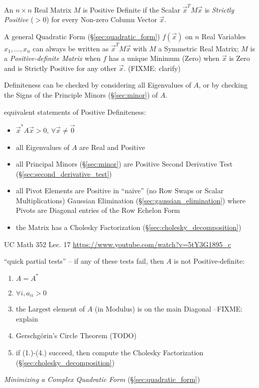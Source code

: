 An $n \times n$ Real Matrix $M$ is Positive Definite if the Scalar
$\vec{x}^TM\vec{x}$ is \emph{Strictly Positive} ($>0$) for every Non-zero
Column Vector $\vec{x}$.

A general Quadratic Form (\S\ref{sec:quadratic_form}) $f(\vec{x})$ on $n$ Real
Variables $x_1,\ldots,x_n$ can always be written as $\vec{x}^T M \vec{x}$ with
$M$ a Symmetric Real Matrix; $M$ is a \emph{Positive-definite Matrix} when $f$
has a unique Minimum (Zero) when $\vec{x}$ is Zero and is Strictly Positive for
any other $\vec{x}$. (FIXME: clarify)

Definiteness can be checked by considering all Eigenvalues of $A$, or by
checking the Signs of the Principle Minors (\S\ref{sec:minor}) of $A$.

equivalent statements of Positive Definiteness:
\begin{itemize}
  \item $\vec{x}^*A\vec{x} > 0$, $\forall \vec{x} \neq \vec{0}$
  \item all Eigenvalues of $A$ are Real and Positive
  \item all Principal Minors (\S\ref{sec:minor}) are Positive \fist Second
    Derivative Test (\S\ref{sec:second_derivative_test})
  \item all Pivot Elements are Positive in ``naive'' (no Row Swaps or Scalar
    Multiplications) Gaussian Elimination (\S\ref{sec:gaussian_elimination})
    where Pivots are Diagonal entries of the Row Echelon Form
  \item the Matrix has a Cholesky Factorization
    (\S\ref{sec:cholesky_decomposition})
\end{itemize}

UC Math 352 Lec. 17 \url{https://www.youtube.com/watch?v=5tY3G1895_c}

``quick partial tests'' -- if any of these tests fail, then $A$ is not
Positive-definite:
\begin{enumerate}
  \item $A = A^*$
  \item $\forall{i}, a_{ii} > 0$
  \item the Largest element of $A$ (in Modulus) is on the main Diagonal
    --FIXME: explain
  \item Gerschg\"orin's Circle Theorem (TODO)
  \item if (1.)-(4.) succeed, then compute the Cholesky Factorization
    (\S\ref{sec:cholesky_decomposition})
\end{enumerate}

\emph{Minimizing a Complex Quadratic Form} (\S\ref{sec:quadratic_form})

